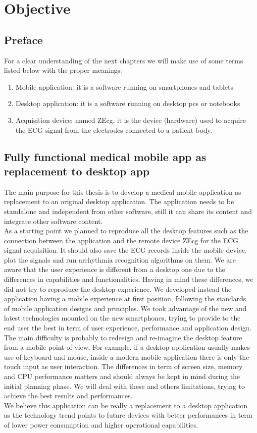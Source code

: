 \chapter{Objective}
\label{Chapter4} 

\section{Preface}
For a clear understanding of the next chapters we will make use of some terms listed below with the proper meanings:
\begin{enumerate}
	\item Mobile application: it is a software running on smartphones and tablets
	\item Desktop application: it is a software running on desktop pcs or notebooks
	\item Acquisition device: named ZEcg, it is the device (hardware) used to acquire the ECG signal from the electrodes connected to a patient body.
\end{enumerate}

\section{Fully functional medical mobile app as replacement to desktop app}
The main purpose for this thesis is to develop a medical  mobile application as replacement to an original desktop application. The application needs to be standalone and independent from other software, still it can share its content and integrate other software content.\\
As a starting point we planned to reproduce all the desktop features such as the connection between the application and the remote device ZEcg for the ECG signal acquisition. It should also save the ECG records inside the mobile device, plot the signals and run arrhythmia recognition algorithms on them.  We are aware that the user experience is different from a desktop one due to the differences in capabilities and functionalities. Having in mind these differences, we did not try to reproduce the desktop experience. We developed instead the application having a mobile experience at first position, following the standards of mobile application designs and principles. We took advantage of the new and latest technologies mounted on the new smartphones, trying to provide to the end user the best in term of user experience, performance and application design. The main difficulty is probably to redesign and re-imagine the desktop feature from a mobile point of view. For example, if a desktop application usually makes use of keyboard and mouse, inside a modern mobile application there is only the touch input as user interaction. The differences in term of screen size, memory and CPU performance matters and should always be kept in mind during the initial planning phase. We will deal with these and others limitations, trying to achieve the best results and performances. \\
We believe this application can be really a replacement to a desktop application as the technology trend points to future devices with better performances in term of lower power consumption and higher operational capabilities.\cite{ref2}


